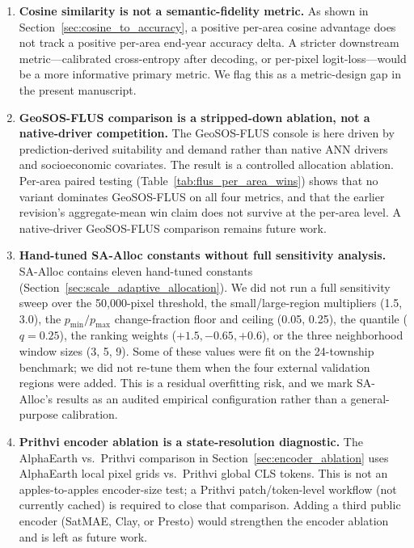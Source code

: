 \documentclass{article}
\begin{document}
\begin{enumerate}
\item \label{lim:cosine_semantic} \textbf{Cosine similarity is not a semantic-fidelity metric.} As shown in Section~\ref{sec:cosine_to_accuracy}, a positive per-area cosine advantage does not track a positive per-area end-year accuracy delta. A stricter downstream metric---calibrated cross-entropy after decoding, or per-pixel logit-loss---would be a more informative primary metric. We flag this as a metric-design gap in the present manuscript.

\item \label{lim:flus_scope} \textbf{GeoSOS-FLUS comparison is a stripped-down ablation, not a native-driver competition.} The GeoSOS-FLUS console is here driven by prediction-derived suitability and demand rather than native ANN drivers and socioeconomic covariates. The result is a controlled allocation ablation. Per-area paired testing (Table~\ref{tab:flus_per_area_wins}) shows that no variant dominates GeoSOS-FLUS on all four metrics, and that the earlier revision's aggregate-mean win claim does not survive at the per-area level. A native-driver GeoSOS-FLUS comparison remains future work.

\item \label{lim:magic_numbers} \textbf{Hand-tuned SA-Alloc constants without full sensitivity analysis.} SA-Alloc contains eleven hand-tuned constants (Section~\ref{sec:scale_adaptive_allocation}). We did not run a full sensitivity sweep over the 50{,}000-pixel threshold, the small/large-region multipliers (1.5, 3.0), the $p_{\min}/p_{\max}$ change-fraction floor and ceiling (0.05, 0.25), the quantile ($q=0.25$), the ranking weights ($+1.5,-0.65,+0.6$), or the three neighborhood window sizes (3, 5, 9). Some of these values were fit on the 24-township benchmark; we did not re-tune them when the four external validation regions were added. This is a residual overfitting risk, and we mark SA-Alloc's results as an audited empirical configuration rather than a general-purpose calibration.

\item \label{lim:encoder_ablation} \textbf{Prithvi encoder ablation is a state-resolution diagnostic.} The AlphaEarth vs.\ Prithvi comparison in Section~\ref{sec:encoder_ablation} uses AlphaEarth local pixel grids vs.\ Prithvi global CLS tokens. This is not an apples-to-apples encoder-size test; a Prithvi patch/token-level workflow (not currently cached) is required to close that comparison. Adding a third public encoder (SatMAE, Clay, or Presto) would strengthen the encoder ablation and is left as future work.


\end{enumerate}
\end{document}
